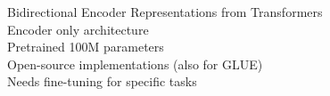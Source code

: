 \documentclass[preview]{standalone}
\begin{document}
Bidirectional Encoder Representations from Transformers\\Encoder only architecture\\Pretrained 100M parameters\\Open-source implementations (also for GLUE)\\Needs fine-tuning for specific tasks\\
\end{document}
